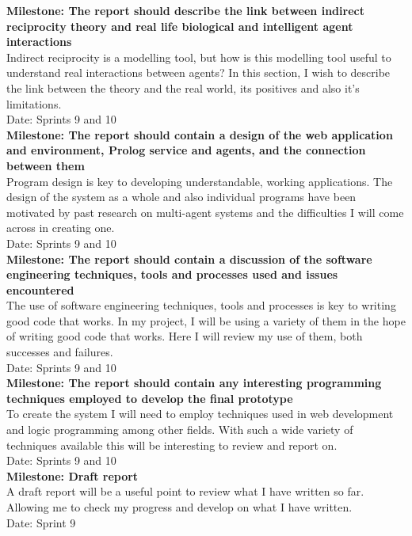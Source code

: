 \documentclass{article}
\begin{document}
\noindent\textbf{Milestone: The report should describe the link between indirect reciprocity theory and real life biological and intelligent agent interactions}\\
Indirect reciprocity is a modelling tool, but how is this modelling tool useful to understand real interactions between agents? In this section, I wish to describe the link between the theory and the real world, its positives and also it's limitations.\\
Date: Sprints 9 and 10\\

\noindent\textbf{Milestone: The report should contain a design of the web application and environment, Prolog service and agents, and the connection between them}\\
Program design is key to developing understandable, working applications. The design of the system as a whole and also individual programs have been motivated by past research on multi-agent systems and the difficulties I will come across in creating one.\\
Date: Sprints 9 and 10\\

\noindent\textbf{Milestone: The report should contain a discussion of the software engineering techniques, tools and processes used and issues encountered}\\
The use of software engineering techniques, tools and processes is key to writing good code that works. In my project, I will be using a variety of them in the hope of writing good code that works. Here I will review my use of them, both successes and failures.\\
Date: Sprints 9 and 10\\

\noindent\textbf{Milestone: The report should contain any interesting programming techniques employed to develop the final prototype}\\
To create the system I will need to employ techniques used in web development and logic programming among other fields. With such a wide variety of techniques available this will be interesting to review and report on.\\
Date: Sprints 9 and 10\\

\noindent\textbf{Milestone: Draft report}\\
A draft report will be a useful point to review what I have written so far. Allowing me to check my progress and develop on what I have written.\\
Date: Sprint 9\\
\end{document}
